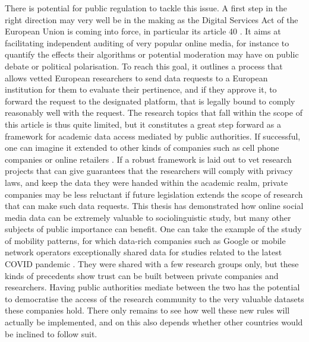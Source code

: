 \documentclass[../thesis.tex]{subfiles}
\begin{document}
There is potential for public regulation to tackle this issue. A first step in the right
direction may very well be in the making as the Digital Services Act of the European
Union is coming into force, in particular its article 40 \cite{DigitalServices2022}. It
aims at facilitating independent auditing of very popular online media, for instance to
quantify the effects their algorithms or potential moderation may have on public debate
or political polarisation. To reach this goal, it outlines a process that allows vetted
European researchers to send data requests to a European institution for them to
evaluate their pertinence, and if they approve it, to forward the request to the
designated platform, that is legally bound to comply reasonably well with the request.
The research topics that fall within the scope of this article is thus quite limited,
but it constitutes a great step forward as a framework for academic data access mediated
by public authorities. If successful, one can imagine it extended to other kinds of
companies such as cell phone companies or online retailers
\cite{PersilyProposalResearcher2021}. If a robust framework is laid out to vet research
projects that can give guarantees that the researchers will comply with privacy laws,
and keep the data they were handed within the academic realm, private companies may be
less reluctant if future legislation extends the scope of research that can make such
data requests. This thesis has demonstrated how online social media data can be
extremely valuable to sociolinguistic study, but many other subjects of public
importance can benefit. One can take the example of the study of mobility patterns, for
which data-rich companies such as Google or mobile network operators exceptionally
shared data for studies related to the latest COVID pandemic
\cite{AguilarImpactUrban2022,GozziEstimatingEffect2021}. They were shared with a few
research groups only, but these kinds of precedents show trust can be built between
private companies and researchers. Having public authorities mediate between the two has
the potential to democratise the access of the research community to the very valuable
datasets these companies hold. There only remains to see how well these new rules will
actually be implemented, and on this also depends whether other countries would be
inclined to follow suit.

\end{document}
